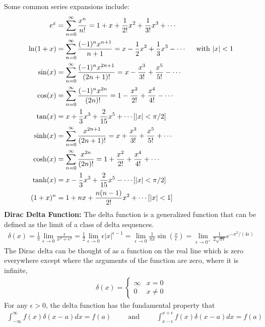 Some common series expansions include: 
\begin{align}
e^x&=\sum_{n=0}^{\infty} \frac{x^n}{n!}=1+x+\frac{1}{2!}x^2 +\frac{1}{3!}x^3 +\cdots \\ 
\ln(1+x)&=\sum_{n=0}^{\infty} \frac{(-1)^{n}x^{n+1}}{n+1}=x-\frac{1}{2}x^2 +\frac{1}{3}x^3 -\cdots\hspace{0.5cm} \textrm{with }|x|<1\\ 
\sin(x)&=\sum_{n=0}^{\infty}\frac{(-1)^{n}x^{2n+1}}{(2n+1)!} = x-\frac{x^3}{3!}+\frac{x^5}{5!}-\cdots \\
\cos(x)&=\sum_{n=0}^{\infty}\frac{(-1)^{n}x^{2n}}{(2n)!} = 1-\frac{x^2}{2!}+\frac{x^4}{4!}-\cdots \\
\tan(x)&= x+\frac{1}{3}x^3+\frac{2}{15}x^5+\cdots[|x|<\pi/2] \\
\sinh(x)&=\sum_{n=0}^{\infty}\frac{x^{2n+1}}{(2n+1)!} = x+\frac{x^3}{3!}+\frac{x^5}{5!}+\cdots \\
\cosh(x)&=\sum_{n=0}^{\infty}\frac{x^{2n}}{(2n)!} = 1+\frac{x^2}{2!}+\frac{x^4}{4!}+\cdots \\
\tanh(x)&= x-\frac{1}{3}x^3+\frac{2}{15}x^5-\cdots[|x|<\pi/2]\\
(1+x)^n&=1+nx+\frac{n(n-1)}{2!}x^2+\cdots[|x| < 1]
\end{align}	
\textbf{Dirac Delta Function:} The delta function is a generalized function that can be defined as the limit of a class of delta sequences.
\begin{align}
	\delta(x) = \frac{1}{\pi}\lim_{\epsilon\rightarrow 0}\frac{\epsilon}{x^2+\epsilon^2} = \frac{1}{2}\lim_{\epsilon\rightarrow 0}\epsilon|x|^{\epsilon-1} =\lim_{\epsilon\rightarrow 0} \frac{1}{\pi x}\sin\left(\frac{x}{\epsilon}\right) = \lim_{\epsilon\rightarrow 0^+}\frac{1}{2\sqrt{\pi \epsilon}}e^{-x^2/(4\epsilon)}
\end{align}
The Dirac delta can be thought of as a function on the real line which is zero everywhere except where the arguments of the function are zero, where it is infinite,
\begin{align}
	\delta(x) = 
	\begin{cases} 
		\infty & x=0 \\
			 0 & x \neq 0 
	\end{cases}
\end{align}
For any $\epsilon > 0$, the delta function has the fundamental property that 
\begin{align}
	\int_{-\infty}^{\infty}f(x)\delta(x-a)dx = f(a) \hspace{1cm}\textrm{and}\hspace{1cm}\int_{x-\epsilon}^{x+\epsilon}f(x)\delta(x-a)dx = f(a)
\end{align}
